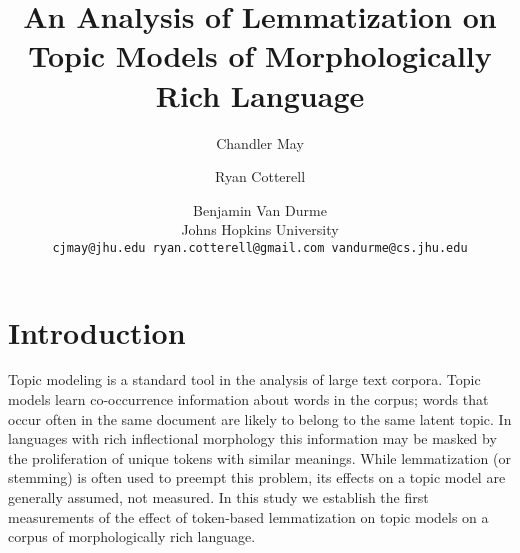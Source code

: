 \documentclass[11pt,letterpaper]{article}
\title{An Analysis of Lemmatization on Topic Models of Morphologically
Rich Language}
\author{Chandler May \and Ryan Cotterell \and Benjamin Van Durme \\
    Johns Hopkins University \\
    \texttt{cjmay@jhu.edu ryan.cotterell@gmail.com
    vandurme@cs.jhu.edu}}
\date{}
\begin{document}
\maketitle

\begin{abstract}
    
\end{abstract}


\section{Introduction}\label{sec:introduction}

Topic modeling is a standard tool in the analysis of large
text corpora. Topic models learn
co-occurrence information about words in the corpus;
words that occur often in the same document are likely to belong to
the same latent topic. In languages with rich inflectional
morphology this information may be masked by the proliferation of
unique tokens with similar meanings.  While lemmatization (or stemming)
is often used to preempt this problem, its effects on a topic model are
generally assumed, not measured.  In this study we establish the first
measurements of the effect of token-based lemmatization on topic models
on a corpus of morphologically rich language.
\end{document}
